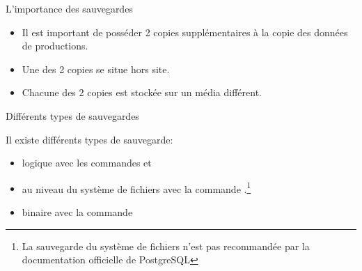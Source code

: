 \begin{frame}{L'importance des sauvegardes}

\begin{itemize}

\item Il est important de posséder 2 copies supplémentaires à la copie des données de productions.
\item Une des 2 copies se situe hors site.
\item Chacune des 2 copies est stockée sur un média différent.

\end{itemize}

\begin{toile}
\end{toile}

\end{frame}


\begin{frame}[fragile]{Différents types de sauvegardes}

Il existe différents types de sauvegarde:

\begin{itemize}

   \item logique avec les commandes  et 
   \item au niveau du système de fichiers avec la commande .\footnote{La sauvegarde du système de fichiers n'est pas recommandée par la documentation officielle de PostgreSQL}
   \item binaire avec la commande 

\end{itemize}

\begin{toile}
\end{toile}

\end{frame}


